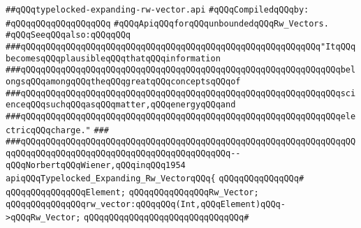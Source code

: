 \label{src/lib/src/typelocked-expanding-rw-vector.api}
\verb|##qQQqtypelocked-expanding-rw-vector.api|\newline
\newline
\verb|#qQQqCompiledqQQqby:|\newline
\verb|#qQQqqQQqqQQqqQQqqQQq|\newline
\newline
\newline
\newline
\verb|#qQQqApiqQQqforqQQqunboundedqQQqRw_Vectors.|\newline
\verb|#qQQqSeeqQQqalso:qQQqqQQq|\newline
\newline
\newline
\verb|###qQQqqQQqqQQqqQQqqQQqqQQqqQQqqQQqqQQqqQQqqQQqqQQqqQQqqQQqqQQq"ItqQQqbecomesqQQqplausibleqQQqthatqQQqinformation|\newline
\verb|###qQQqqQQqqQQqqQQqqQQqqQQqqQQqqQQqqQQqqQQqqQQqqQQqqQQqqQQqqQQqqQQqbelongsqQQqamongqQQqtheqQQqgreatqQQqconceptsqQQqof|\newline
\verb|###qQQqqQQqqQQqqQQqqQQqqQQqqQQqqQQqqQQqqQQqqQQqqQQqqQQqqQQqqQQqqQQqscienceqQQqsuchqQQqasqQQqmatter,qQQqenergyqQQqand|\newline
\verb|###qQQqqQQqqQQqqQQqqQQqqQQqqQQqqQQqqQQqqQQqqQQqqQQqqQQqqQQqqQQqqQQqelectricqQQqcharge."|\newline
\verb|###|\newline
\verb|###qQQqqQQqqQQqqQQqqQQqqQQqqQQqqQQqqQQqqQQqqQQqqQQqqQQqqQQqqQQqqQQqqQQqqQQqqQQqqQQqqQQqqQQqqQQqqQQqqQQqqQQqqQQqqQQq--qQQqNorbertqQQqWiener,qQQqinqQQq1954|\newline
\newline
\newline
\newline
\verb|apiqQQqTypelocked_Expanding_Rw_VectorqQQq{|\newline
\verb|qQQqqQQqqQQqqQQq#|\newline
\verb|qQQqqQQqqQQqqQQqElement;|\newline
\verb|qQQqqQQqqQQqqQQqRw_Vector;|\newline
\newline
\verb|qQQqqQQqqQQqqQQqrw_vector:qQQqqQQq(Int,qQQqElement)qQQq->qQQqRw_Vector;|\newline
\verb|qQQqqQQqqQQqqQQqqQQqqQQqqQQqqQQq#|\newline
